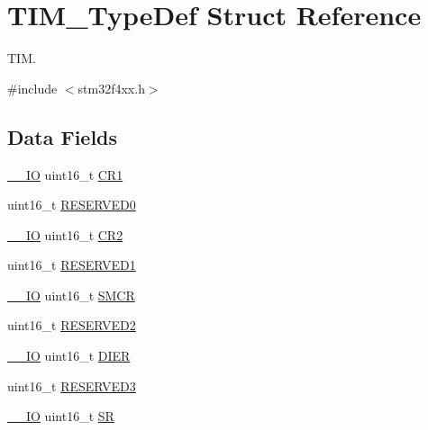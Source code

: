 \hypertarget{struct_t_i_m___type_def}{}\section{T\+I\+M\+\_\+\+Type\+Def Struct Reference}
\label{struct_t_i_m___type_def}


T\+IM.  




{\ttfamily \#include $<$stm32f4xx.\+h$>$}

\subsection*{Data Fields}
\begin{DoxyCompactItemize}
\item 
\hyperlink{group___c_m_s_i_s__core__definitions_gaec43007d9998a0a0e01faede4133d6be}{\+\_\+\+\_\+\+IO} uint16\+\_\+t \hyperlink{struct_t_i_m___type_def_a61400ce239355b62aa25c95fcc18a5e1}{C\+R1}
\item 
uint16\+\_\+t \hyperlink{struct_t_i_m___type_def_a149feba01f9c4a49570c6d88619f504f}{R\+E\+S\+E\+R\+V\+E\+D0}
\item 
\hyperlink{group___c_m_s_i_s__core__definitions_gaec43007d9998a0a0e01faede4133d6be}{\+\_\+\+\_\+\+IO} uint16\+\_\+t \hyperlink{struct_t_i_m___type_def_a2a3e81bd118d1bc52d24a0b0772e6a0c}{C\+R2}
\item 
uint16\+\_\+t \hyperlink{struct_t_i_m___type_def_a8249a3955aace28d92109b391311eb30}{R\+E\+S\+E\+R\+V\+E\+D1}
\item 
\hyperlink{group___c_m_s_i_s__core__definitions_gaec43007d9998a0a0e01faede4133d6be}{\+\_\+\+\_\+\+IO} uint16\+\_\+t \hyperlink{struct_t_i_m___type_def_a02758713abfe580460dd5bcd8762702a}{S\+M\+CR}
\item 
uint16\+\_\+t \hyperlink{struct_t_i_m___type_def_a5573848497a716a9947fd87487709feb}{R\+E\+S\+E\+R\+V\+E\+D2}
\item 
\hyperlink{group___c_m_s_i_s__core__definitions_gaec43007d9998a0a0e01faede4133d6be}{\+\_\+\+\_\+\+IO} uint16\+\_\+t \hyperlink{struct_t_i_m___type_def_a1481b34cc41018c17e4ab592a1c8cb55}{D\+I\+ER}
\item 
uint16\+\_\+t \hyperlink{struct_t_i_m___type_def_a6c3b31022e6f59b800e9f5cc2a89d54c}{R\+E\+S\+E\+R\+V\+E\+D3}
\item 
\hyperlink{group___c_m_s_i_s__core__definitions_gaec43007d9998a0a0e01faede4133d6be}{\+\_\+\+\_\+\+IO} uint16\+\_\+t \hyperlink{struct_t_i_m___type_def_a44962ea5442d203bf4954035d1bfeb9d}{SR}

\end{DoxyCompactItemize}
